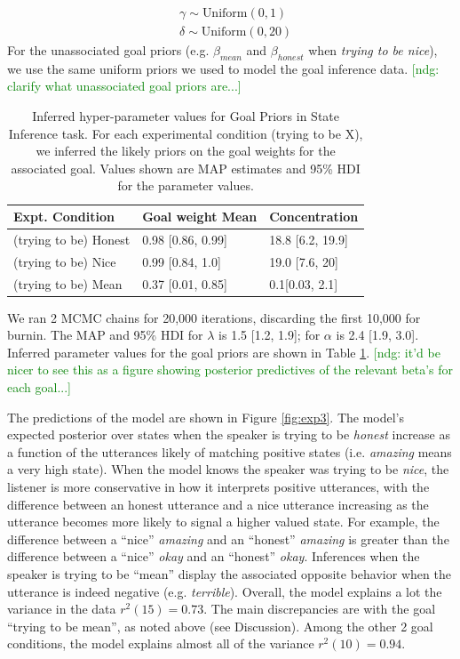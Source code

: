 \documentclass[10pt,letterpaper]{article}
\newcommand{\red}[1]{\textcolor{Red}{#1}}
\newcommand{\ndg}[1]{\textcolor{Green}{[ndg: #1]}}
\newcommand{\mht}[1]{\textcolor{DarkOrange}{[mht: #1]}}
\begin{document}
%
\begin{eqnarray*}
& \gamma \sim  \text{Uniform}(0,1)\\
& \delta  \sim  \text{Uniform}(0, 20)
\end{eqnarray*}
For the unassociated goal priors (e.g. $\beta_{mean}$ and $\beta_{honest}$ when \emph{trying to be nice}), we use the same uniform priors we used to model the goal inference data.
\ndg{clarify what unassociated goal priors are...}

\begin{table}[]
\centering
\begin{tabular}{lll}
\hline
Expt. Condition  & Goal weight Mean & Concentration \\ \hline
(trying to be) Honest                        &   0.98 [0.86, 0.99]   & 18.8 [6.2, 19.9] \\
(trying to be) Nice                          & 0.99 [0.84, 1.0] & 19.0 [7.6, 20] \\
(trying to be) Mean                          &0.37 [0.01, 0.85] & 0.1[0.03, 2.1] \\ \hline
\end{tabular}
\caption{\label{tab:params} Inferred hyper-parameter values for Goal Priors in State Inference task.
For each experimental condition (trying to be X), we inferred the likely priors on the goal weights for the associated goal.
Values shown are MAP estimates and 95\% HDI for the parameter values.}
\end{table}
We ran 2 MCMC chains for 20,000 iterations, discarding the first 10,000 for burnin.
The MAP and 95\% HDI for $\lambda$ is 1.5 [1.2, 1.9]; for $\alpha$ is 2.4 [1.9, 3.0]. %
Inferred parameter values for the goal priors are shown in Table \ref{tab:params}.
\ndg{it'd be nicer to see this as a figure showing posterior predictives of the relevant beta's for each goal...}

The predictions of the model are shown in Figure \ref{fig:exp3}.
The model's expected posterior over states when the speaker is trying to be \emph{honest} increase as a function of the utterances likely of matching positive states (i.e. \emph{amazing} means a very high state).
When the model knows the speaker was trying to be \emph{nice}, the listener is more conservative in how it interprets positive utterances, with the difference between an honest utterance and a nice utterance increasing as the utterance becomes more likely to signal a higher valued state. 
For example, the difference between a ``nice'' \emph{amazing} and an ``honest'' \emph{amazing} is greater than the difference between a ``nice'' \emph{okay} and an ``honest'' \emph{okay}.
Inferences when the speaker is trying to be ``mean'' display the associated opposite behavior when the utterance is indeed negative (e.g. \emph{terrible}).
Overall, the model explains a lot the variance in the data $r^2(15) = 0.73$. 
The main discrepancies are with the goal ``trying to be mean'', as noted above (see Discussion). 
Among the other 2 goal conditions, the model explains almost all of the variance $r^2(10) = 0.94$. 
\end{document}
